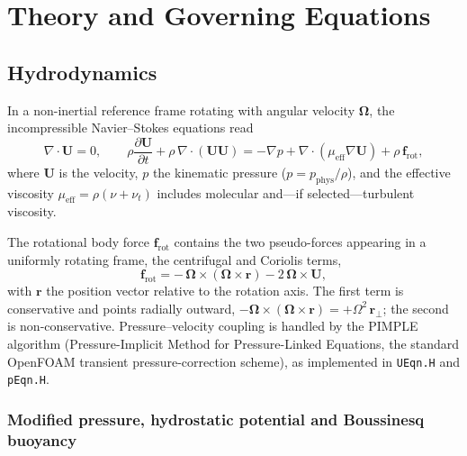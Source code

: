 \documentclass[11pt,a4paper]{article}
\begin{document}


\section{Theory and Governing Equations}

\subsection{Hydrodynamics}

In a non-inertial reference frame rotating with angular velocity
\(\boldsymbol{\Omega}\), the incompressible Navier–Stokes equations read
\begin{equation}
	\nabla\cdot\mathbf{U} = 0,\qquad
	\rho \frac{\partial\mathbf{U}}{\partial t} + \rho\,\nabla\cdot(\mathbf{U}\mathbf{U})
	= -\nabla p + \nabla\cdot(\mu_{\mathrm{eff}}\nabla\mathbf{U})
	+ \rho\,\mathbf{f}_{\mathrm{rot}},
\end{equation}
where \(\mathbf{U}\) is the velocity, \(p\) the kinematic pressure
(\(p=p_{\mathrm{phys}}/\rho\)), and the effective viscosity
\(\mu_{\mathrm{eff}} = \rho(\nu + \nu_t)\) includes molecular and—if
selected—turbulent viscosity.

The rotational body force \(\mathbf{f}_{\mathrm{rot}}\) contains the
two pseudo-forces appearing in a uniformly rotating frame, the
centrifugal and Coriolis terms,
\begin{equation}
	\mathbf{f}_{\mathrm{rot}}
	= -\,\boldsymbol{\Omega}\times(\boldsymbol{\Omega}\times\mathbf{r})
	- 2\,\boldsymbol{\Omega}\times\mathbf{U},
\end{equation}
with \(\mathbf{r}\) the position vector relative to the rotation axis.
The first term is conservative and points radially outward,
\(-\boldsymbol{\Omega}\times(\boldsymbol{\Omega}\times\mathbf{r})
= +\Omega^2\,\mathbf{r}_{\!\perp}\); the second is non-conservative.
Pressure--velocity coupling is handled by the PIMPLE algorithm
(Pressure-Implicit Method for Pressure-Linked Equations, the standard
OpenFOAM transient pressure-correction scheme), as implemented in
\texttt{UEqn.H} and \texttt{pEqn.H}.







\subsubsection{Modified pressure, hydrostatic potential and Boussinesq buoyancy}
\end{document}
